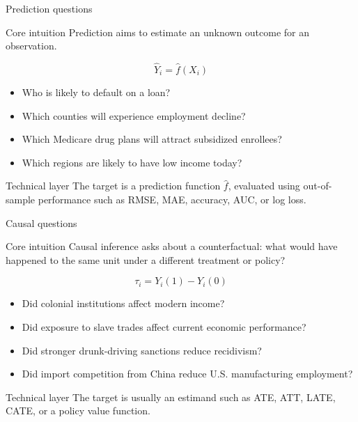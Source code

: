 \documentclass[aspectratio=169,11pt]{beamer}
\newcommand{\core}[1]{\begin{block}{Core intuition}#1\end{block}}
\newcommand{\grad}[1]{\begin{alertblock}{Technical layer}#1\end{alertblock}}
\begin{document}
\begin{frame}{Prediction questions}
\core{
Prediction aims to estimate an unknown outcome for an observation.
}
\[
\widehat{Y}_i = \widehat{f}(X_i)
\]
\begin{itemize}
  \item Who is likely to default on a loan?
  \item Which counties will experience employment decline?
  \item Which Medicare drug plans will attract subsidized enrollees?
  \item Which regions are likely to have low income today?
\end{itemize}
\grad{
The target is a prediction function $\widehat f$, evaluated using out-of-sample performance such as RMSE, MAE, accuracy, AUC, or log loss.
}
\end{frame}

\begin{frame}{Causal questions}
\core{
Causal inference asks about a counterfactual: what would have happened to the same unit under a different treatment or policy?
}
\[
\tau_i = Y_i(1)-Y_i(0)
\]
\begin{itemize}
  \item Did colonial institutions affect modern income?
  \item Did exposure to slave trades affect current economic performance?
  \item Did stronger drunk-driving sanctions reduce recidivism?
  \item Did import competition from China reduce U.S. manufacturing employment?
\end{itemize}
\grad{
The target is usually an estimand such as ATE, ATT, LATE, CATE, or a policy value function.
}
\end{frame}
\end{document}
